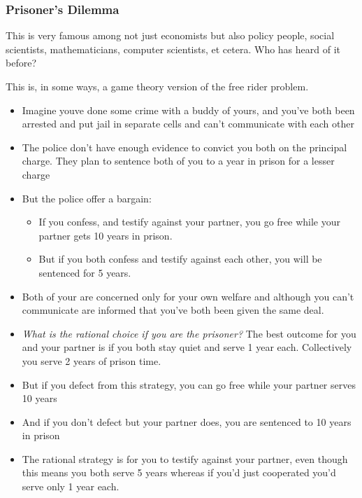 \documentclass[11pt]{article}
\begin{document}
\subsubsection{Prisoner's Dilemma}

This is very famous among not just economists but also policy people, social scientists, mathematicians, computer scientists, et cetera. Who has heard of it before?

This is, in some ways, a game theory version of the free rider problem.

\begin{itemize}
    \item Imagine youve done some crime with a buddy of yours, and you've both been arrested and put jail in separate cells and can't communicate with each other
    \item The police don't have enough evidence to convict you both on the principal charge. They plan to sentence both of you to a year in prison for a lesser charge
    \item But the police offer a bargain: 
    \begin{itemize}
        \item If you confess, and testify against your partner, you go free while your partner gets 10 years in prison.
        \item But if you both confess and testify against each other, you will be sentenced for 5 years.
    \end{itemize}
    \item Both of your are concerned only for your own welfare and although you can't communicate are informed that you've both been given the same deal.
    \item {\it What is the rational choice if you are the prisoner?} The best outcome for you and your partner is if you both stay quiet and serve 1 year each. Collectively you serve 2 years of prison time. 
    \item But if you defect from this strategy, you can go free while your partner serves 10 years 
    \item And if you don't defect but your partner does, you are sentenced to 10 years in prison
    \item The rational strategy is for you to testify against your partner, even though this means you both serve 5 years whereas if you'd just cooperated you'd serve only 1 year each. 
\end{itemize}
\end{document}
